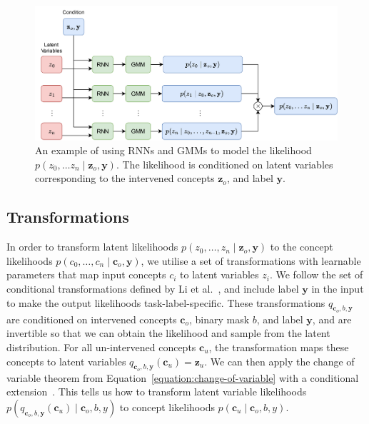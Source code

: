 \begin{figure}[!ht]
    \centering
    \includegraphics[width=\textwidth]{figs/method/latent-rnn.png}
    \caption{An example of using RNNs and GMMs to model the likelihood $p(z_0, \ldots z_n \mid  \mathbf{z}_o, \mathbf{y})$. The likelihood is conditioned on latent variables corresponding to the intervened concepts $\mathbf{z}_o$, and label $\mathbf{y}.$}
    \label{fig:latent-rnn}
\end{figure}
 

\subsection{Transformations}
In order to transform latent likelihoods $p(z_0, \ldots, z_n \mid \mathbf{z}_o , \mathbf{y})$ to 
the concept likelihoods
$p(c_0,\ldots, c_n \mid \mathbf{c}_o , \mathbf{y})$, we
utilise a set of transformations with learnable parameters that 
map input concepts $c_i$ to latent variables $z_i$. We follow the 
set of conditional transformations defined by Li et al.~\cite{acflow}, and include label $\mathbf{y}$ in the input to make the output likelihoods task-label-specific.
These transformations $q_{\mathbf{c}_o, b, \mathbf{y}}$ are
conditioned on 
intervened concepts $\mathbf{c}_o$, binary mask $b$, and label $\mathbf{y}$, 
and are invertible so that we can obtain the likelihood and 
sample from the latent distribution. 
For all un-intervened concepts $\mathbf{c}_u$,
the transformation maps these concepts to latent variables $q_{\mathbf{c}_o, b, \mathbf{y}}(\mathbf{c}_u) = \mathbf{z}_u$. 
We can then apply the change
of variable theorem from Equation~\ref{equation:change-of-variable} with a conditional extension~\cite{acflow}.
This tells us how to transform 
latent variable likelihoods $p(q_{\mathbf{c}_o, b, \mathbf{y}}(\mathbf{c}_u) \mid \mathbf{c}_o, b, y)$ to concept likelihoods $p(\mathbf{c}_u \mid \mathbf{c}_o, b, y)$.

